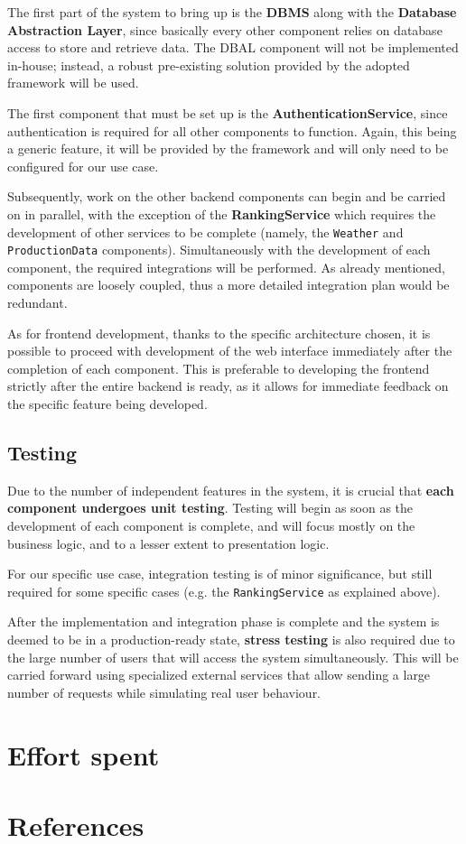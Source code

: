 \documentclass{article}
\begin{document}
\par The first part of the system to bring up is the \textbf{DBMS} along with the \textbf{Database Abstraction Layer}, since basically every other component relies on database access to store and retrieve data. The DBAL component will not be implemented in-house; instead, a robust pre-existing solution provided by the adopted framework will be used.

\par The first component that must be set up is the \textbf{AuthenticationService}, since authentication is required for all other components to function. Again, this being a generic feature, it will be provided by the framework and will only need to be configured for our use case.

\par Subsequently, work on the other backend components can begin and be carried on in parallel, with the exception of the \textbf{RankingService} which requires the development of other services to be complete (namely, the \verb|Weather| and \verb|ProductionData| components). Simultaneously with the development of each component, the required integrations will be performed. As already mentioned, components are loosely coupled, thus a more detailed integration plan would be redundant.

\par As for frontend development, thanks to the specific architecture chosen, it is possible to proceed with development of the web interface immediately after the completion of each component. This is preferable to developing the frontend strictly after the entire backend is ready, as it allows for immediate feedback on the specific feature being developed.

\subsection{Testing}
Due to the number of independent features in the system, it is crucial that \textbf{each component undergoes unit testing}. Testing will begin as soon as the development of each component is complete, and will focus mostly on the business logic, and to a lesser extent to presentation logic.

\par For our specific use case, integration testing is of minor significance, but still required for some specific cases (e.g. the \verb|RankingService| as explained above).

\par After the implementation and integration phase is complete and the system is deemed to be in a production-ready state, \textbf{stress testing} is also required due to the large number of users that will access the system simultaneously. This will be carried forward using specialized external services that allow sending a large number of requests while simulating real user behaviour.
\newpage
\section{Effort spent}
\newpage
\section{References}
\end{document}
